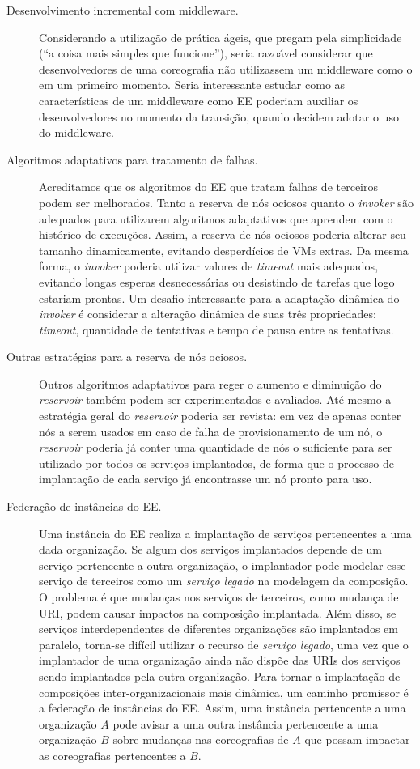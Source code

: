 \begin{description}
\item[Desenvolvimento incremental com middleware.]
Considerando a utilização de prática ágeis, que pregam pela simplicidade
(``a coisa mais simples que funcione''), seria razoável considerar que 
desenvolvedores de uma coreografia não utilizassem um middleware como o \ee
em um primeiro momento. Seria interessante estudar como as características
de um middleware como EE poderiam auxiliar os desenvolvedores no momento
da transição, quando decidem adotar o uso do middleware.

\item[Algoritmos adaptativos para tratamento de falhas.] 
Acreditamos que os algoritmos do EE que tratam falhas de terceiros podem ser melhorados.
Tanto a reserva de nós ociosos quanto o \emph{invoker} são adequados 
para utilizarem algoritmos adaptativos que aprendem com o histórico de
execuções. Assim, a reserva de nós ociosos poderia alterar seu tamanho dinamicamente,
evitando desperdícios de VMs extras. Da mesma forma, o \emph{invoker}
poderia utilizar valores de \emph{timeout} mais adequados, evitando longas
esperas desnecessárias ou desistindo de tarefas que logo estariam prontas.
Um desafio interessante para a adaptação dinâmica do \emph{invoker} é
considerar a alteração dinâmica de suas três propriedades:
\emph{timeout}, quantidade de tentativas e tempo de pausa entre as tentativas.

\item[Outras estratégias para a reserva de nós ociosos.]
Outros algoritmos adaptativos para reger o aumento e diminuição do \emph{reservoir}
também podem ser experimentados e avaliados.
Até mesmo a estratégia geral do \emph{reservoir} poderia ser revista:
em vez de apenas conter nós a serem usados em caso de falha de provisionamento de um nó,
o \emph{reservoir} poderia já conter uma quantidade de nós o suficiente
para ser utilizado por todos os serviços implantados, de forma
que o processo de implantação de cada serviço já encontrasse um nó
pronto para uso.

\item[Federação de instâncias do EE.] Uma instância do EE realiza a implantação
de serviços pertencentes a uma dada organização. Se algum dos serviços implantados
depende de um serviço pertencente a outra organização, o implantador
pode modelar esse serviço de terceiros como um \emph{serviço legado}
na modelagem da composição. O problema é que mudanças nos serviços de
terceiros, como mudança de URI, podem causar impactos na composição implantada.
Além disso, se serviços interdependentes de diferentes organizações são implantados em paralelo,
torna-se difícil utilizar o recurso de \emph{serviço legado},
uma vez que o implantador de uma organização ainda não dispõe das URIs 
dos serviços sendo implantados pela outra organização.
Para tornar a implantação de composições inter-organizacionais mais dinâmica,
um caminho promissor é a federação de instâncias do EE.
Assim, uma instância pertencente a uma organização $A$ pode avisar a
uma outra instância pertencente a uma organização $B$ sobre mudanças 
nas coreografias de $A$ que possam impactar as coreografias pertencentes a $B$.


\end{description}
